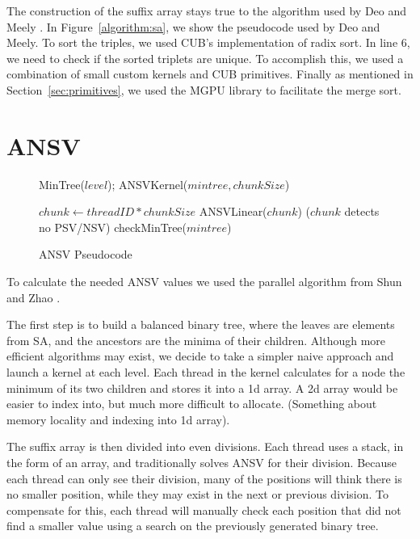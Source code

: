 The construction of the suffix array stays true to the algorithm used by Deo and Meely \cite{Deo}.
In Figure~\ref{algorithm:sa}, we show the pseudocode used by Deo and Meely.
To sort the triples, we used CUB's implementation of radix sort.
In line 6, we need to check if the sorted triplets are unique.
To accomplish this, we used a combination of small custom kernels and CUB primitives.
Finally as mentioned in Section~\ref{sec:primitives}, we used the MGPU library to facilitate the merge sort.

\section{ANSV}

\begin{figure}
\begin{algorithmic}[1]
\State MinTree($level$);
\EndFor
\State ANSVKernel($mintree,chunkSize$)
\EndProcedure
\end{algorithmic}
\begin{algorithmic}[1]
\State $chunk \gets threadID * chunkSize$
\State ANSVLinear($chunk$)
\If($chunk$ detects no PSV/NSV)
\State checkMinTree($mintree$)
\EndIf
\EndProcedure
\end{algorithmic}
\caption{ANSV Pseudocode}
\label{algorithm:ansv}
\end{figure}

To calculate the needed ANSV values we used the parallel algorithm from Shun and Zhao \cite{shun2013practical}.

The first step is to build a balanced binary tree, where the leaves are elements from SA, and the ancestors are the minima of their children.
Although more efficient algorithms may exist, we decide to take a simpler naive approach and launch a kernel at each level.
Each thread in the kernel calculates for a node the minimum of its two children and stores it into a 1d array.
A 2d array would be easier to index into, but much more difficult to allocate.
(Something about memory locality and indexing into 1d array).

The suffix array is then divided into even divisions.
Each thread uses a stack, in the form of an array, and traditionally solves ANSV for their division.
Because each thread can only see their division, many of the positions will think there is no smaller position, while they may exist in the next or previous division.
To compensate for this, each thread will manually check each position that did not find a smaller value using a search on the previously generated binary tree.

